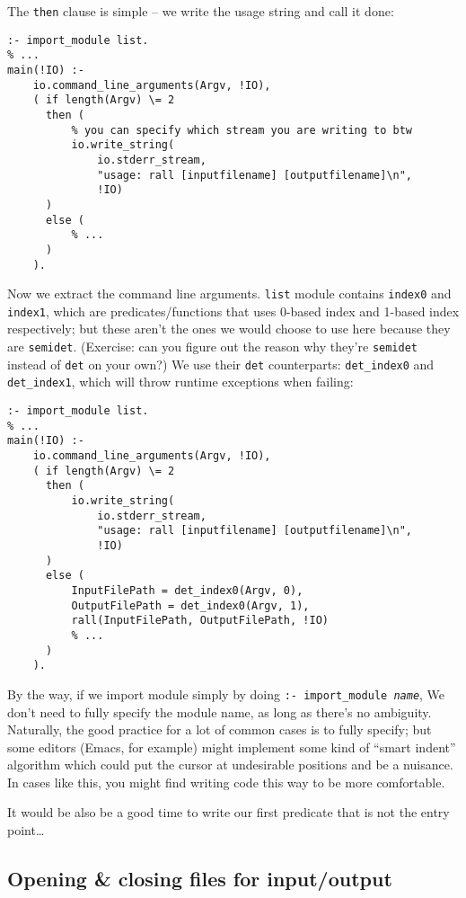 The \texttt{then} clause is simple -- we write the usage string and call it done:

\begin{lstlisting}[language=Mercury]
:- import_module list.
% ...
main(!IO) :-
    io.command_line_arguments(Argv, !IO),
    ( if length(Argv) \= 2
      then (
          % you can specify which stream you are writing to btw
          io.write_string(
              io.stderr_stream,
              "usage: rall [inputfilename] [outputfilename]\n",
              !IO)
      )
      else (
          % ...
      )
    ).
\end{lstlisting}

Now we extract the command line arguments. \texttt{list} module contains \texttt{index0} and \texttt{index1}, which are predicates/functions that uses 0-based index and 1-based index respectively; but these aren't the ones we would choose to use here because they are \texttt{semidet}. (Exercise: can you figure out the reason why they're \texttt{semidet} instead of \texttt{det} on your own?) We use their \texttt{det} counterparts: \texttt{det\_index0} and \texttt{det\_index1}, which will throw runtime exceptions when failing:

\begin{lstlisting}[language=Mercury]
:- import_module list.
% ...
main(!IO) :-
    io.command_line_arguments(Argv, !IO),
    ( if length(Argv) \= 2
      then (
          io.write_string(
              io.stderr_stream,
              "usage: rall [inputfilename] [outputfilename]\n",
              !IO)
      )
      else (
          InputFilePath = det_index0(Argv, 0),
          OutputFilePath = det_index0(Argv, 1),
          rall(InputFilePath, OutputFilePath, !IO)
          % ...
      )
    ).
\end{lstlisting}

By the way, if we import module simply by doing \texttt{:- import\_module \textit{name}}, We don't need to fully specify the module name, as long as there's no ambiguity. Naturally, the good practice for a lot of common cases is to fully specify; but some editors (Emacs, for example) might implement some kind of ``smart indent'' algorithm which could put the cursor at undesirable positions and be a nuisance. In cases like this, you might find writing code this way to be more comfortable.

It would be also be a good time to write our first predicate that is not the entry point\ldots{}
\subsection{Opening \& closing files for input/output}
\label{sec:org924f9ab}

